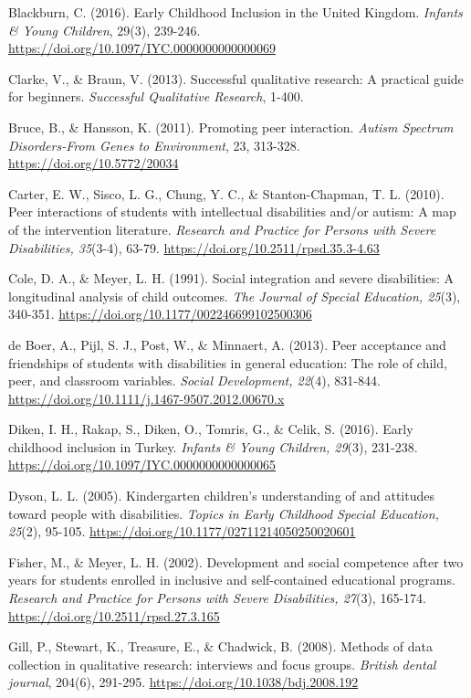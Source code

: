 \documentclass[11.5pt]{sig-alternate}
\begin{document}
\begin{large}
Blackburn, C. (2016). Early Childhood Inclusion in the United Kingdom. \textit{Infants \& Young Children}, 29(3), 239-246. \url{https://doi.org/10.1097/IYC.0000000000000069}

Clarke, V., \& Braun, V. (2013). Successful qualitative research: A practical guide for beginners. \textit{Successful Qualitative Research}, 1-400.

Bruce, B., \& Hansson, K. (2011). Promoting peer interaction. \textit{Autism Spectrum Disorders-From Genes to Environment}, 23, 313-328. \url{https://doi.org/10.5772/20034}

Carter, E. W., Sisco, L. G., Chung, Y. C., \& Stanton-Chapman, T. L. (2010). Peer interactions of students with intellectual disabilities and/or autism: A map of the intervention literature.\textit{ Research and Practice for Persons with Severe Disabilities, 35}(3-4), 63-79. \url{https://doi.org/10.2511/rpsd.35.3-4.63}

Cole, D. A., \& Meyer, L. H. (1991). Social integration and severe disabilities: A longitudinal analysis of child outcomes. \textit{The Journal of Special Education, 25}(3), 340-351. \url{https://doi.org/10.1177/002246699102500306}

de Boer, A., Pijl, S. J., Post, W., \& Minnaert, A. (2013). Peer acceptance and friendships of students with disabilities in general education: The role of child, peer, and classroom variables. \textit{Social Development, 22}(4), 831-844. \url{https://doi.org/10.1111/j.1467-9507.2012.00670.x}

Diken, I. H., Rakap, S., Diken, O., Tomris, G., \& Celik, S. (2016). Early childhood inclusion in Turkey. \textit{Infants \& Young Children, 29}(3), 231-238. \url{https://doi.org/10.1097/IYC.0000000000000065}

Dyson, L. L. (2005). Kindergarten children's understanding of and attitudes toward people with disabilities. \textit{Topics in Early Childhood Special Education, 25}(2), 95-105. \url{https://doi.org/10.1177/02711214050250020601}

Fisher, M., \& Meyer, L. H. (2002). Development and social competence after two years for students enrolled in inclusive and self-contained educational programs. \textit{Research and Practice for Persons with Severe Disabilities, 27}(3), 165-174. \url{https://doi.org/10.2511/rpsd.27.3.165}

Gill, P., Stewart, K., Treasure, E., \& Chadwick, B. (2008). Methods of data collection in qualitative research: interviews and focus groups. \textit{British dental journal}, 204(6), 291-295. \url{https://doi.org/10.1038/bdj.2008.192}


\end{large}
\end{document}
